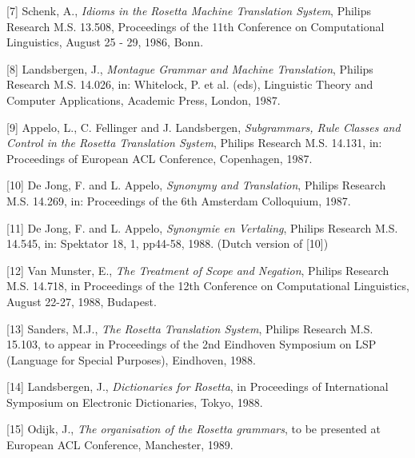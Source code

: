 \bigskip

[7] Schenk, A., {\em Idioms in the Rosetta Machine Translation System},
        Philips Research M.S. 13.508, {\sf Proceedings of the 11th Conference on 
        Computational Linguistics}, August 25 - 29, 1986, Bonn.

\bigskip

[8] Landsbergen, J., {\em Montague Grammar and Machine Translation},
        Philips Research M.S. 14.026, in: Whitelock, P. et al. (eds), 
        {\sf Linguistic Theory and Computer Applications}, Academic
 Press, London, 1987.

\bigskip

[9] Appelo, L., C. Fellinger and J. Landsbergen, {\em Subgrammars, Rule Classes
        and Control in the Rosetta Translation System}, 
        Philips Research M.S. 14.131, in: {\sf Proceedings of European ACL
        Conference}, Copenhagen, 1987.

\bigskip


[10] De Jong, F. and L. Appelo, {\em Synonymy and Translation},
        Philips Research M.S. 14.269, in: {\sf Proceedings of the
        6th Amsterdam Colloquium}, 1987.

\bigskip

[11] De Jong, F. and L. Appelo, {\em Synonymie en Vertaling},
        Philips Research M.S. 14.545, in: {\sf Spektator} 18, 1, pp44-58, 1988.
        (Dutch version of [10])

\bigskip

[12] Van Munster, E., {\em The Treatment of Scope and Negation}, 
Philips Research M.S. 14.718, in {\sf 
Proceedings of the 12th Conference on Computational Linguistics}, August 22-27,
1988, Budapest.

\bigskip

[13] Sanders, M.J., {\em The Rosetta Translation System}, Philips Research M.S. 
15.103, to appear in {\sf Proceedings of the 2nd Eindhoven Symposium on 
LSP (Language for Special Purposes)}, Eindhoven, 1988.

\bigskip

[14] Landsbergen, J., {\em Dictionaries for Rosetta}, in {\sf Proceedings of 
International Symposium on Electronic Dictionaries}, Tokyo, 1988.

\bigskip

[15] Odijk, J., {\em The organisation of the Rosetta grammars}, 
to be presented at {\sf European ACL Conference}, Manchester, 1989.

\bigskip

